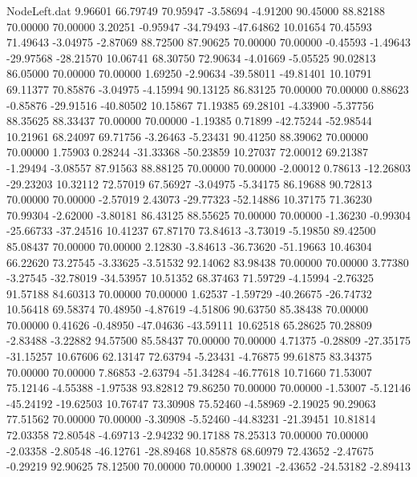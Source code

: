 \begin{filecontents}{NodeLeft.dat}
   9.96601   66.79749   70.95947    -3.58694   -4.91200   90.45000   88.82188   70.00000   70.00000    3.20251   -0.95947  -34.79493  -47.64862
  10.01654   70.45593   71.49643    -3.04975   -2.87069   88.72500   87.90625   70.00000   70.00000   -0.45593   -1.49643  -29.97568  -28.21570
  10.06741   68.30750   72.90634    -4.01669   -5.05525   90.02813   86.05000   70.00000   70.00000    1.69250   -2.90634  -39.58011  -49.81401
  10.10791   69.11377   70.85876    -3.04975   -4.15994   90.13125   86.83125   70.00000   70.00000    0.88623   -0.85876  -29.91516  -40.80502
  10.15867   71.19385   69.28101    -4.33900   -5.37756   88.35625   88.33437   70.00000   70.00000   -1.19385    0.71899  -42.75244  -52.98544
  10.21961   68.24097   69.71756    -3.26463   -5.23431   90.41250   88.39062   70.00000   70.00000    1.75903    0.28244  -31.33368  -50.23859
  10.27037   72.00012   69.21387    -1.29494   -3.08557   87.91563   88.88125   70.00000   70.00000   -2.00012    0.78613  -12.26803  -29.23203
  10.32112   72.57019   67.56927    -3.04975   -5.34175   86.19688   90.72813   70.00000   70.00000   -2.57019    2.43073  -29.77323  -52.14886
  10.37175   71.36230   70.99304    -2.62000   -3.80181   86.43125   88.55625   70.00000   70.00000   -1.36230   -0.99304  -25.66733  -37.24516
  10.41237   67.87170   73.84613    -3.73019   -5.19850   89.42500   85.08437   70.00000   70.00000    2.12830   -3.84613  -36.73620  -51.19663
  10.46304   66.22620   73.27545    -3.33625   -3.51532   92.14062   83.98438   70.00000   70.00000    3.77380   -3.27545  -32.78019  -34.53957
  10.51352   68.37463   71.59729    -4.15994   -2.76325   91.57188   84.60313   70.00000   70.00000    1.62537   -1.59729  -40.26675  -26.74732
  10.56418   69.58374   70.48950    -4.87619   -4.51806   90.63750   85.38438   70.00000   70.00000    0.41626   -0.48950  -47.04636  -43.59111
  10.62518   65.28625   70.28809    -2.83488   -3.22882   94.57500   85.58437   70.00000   70.00000    4.71375   -0.28809  -27.35175  -31.15257
  10.67606   62.13147   72.63794    -5.23431   -4.76875   99.61875   83.34375   70.00000   70.00000    7.86853   -2.63794  -51.34284  -46.77618
  10.71660   71.53007   75.12146    -4.55388   -1.97538   93.82812   79.86250   70.00000   70.00000   -1.53007   -5.12146  -45.24192  -19.62503
  10.76747   73.30908   75.52460    -4.58969   -2.19025   90.29063   77.51562   70.00000   70.00000   -3.30908   -5.52460  -44.83231  -21.39451
  10.81814   72.03358   72.80548    -4.69713   -2.94232   90.17188   78.25313   70.00000   70.00000   -2.03358   -2.80548  -46.12761  -28.89468
  10.85878   68.60979   72.43652    -2.47675   -0.29219   92.90625   78.12500   70.00000   70.00000    1.39021   -2.43652  -24.53182   -2.89413

\end{filecontents}
